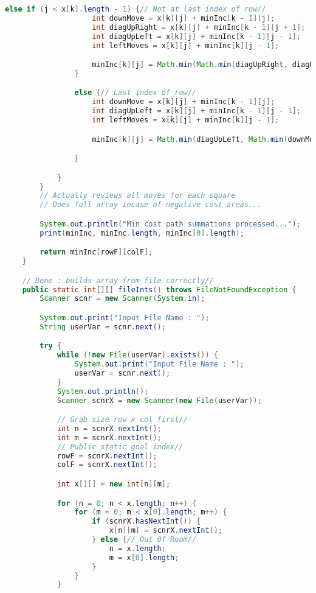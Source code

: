 \documentclass[11pt]{article}
\begin{document}
\begin{enumerate}
\begin{lstlisting}[language=Java]
                else if (j < x[k].length - 1) {// Not at last index of row//
                    int downMove = x[k][j] + minInc[k - 1][j];
                    int diagUpRight = x[k][j] + minInc[k - 1][j + 1];
                    int diagUpLeft = x[k][j] + minInc[k - 1][j - 1];
                    int leftMoves = x[k][j] + minInc[k][j - 1];

                    minInc[k][j] = Math.min(Math.min(diagUpRight, diagUpLeft), Math.min(downMove, leftMoves));
                }

                else {// Last index of row//
                    int downMove = x[k][j] + minInc[k - 1][j];
                    int diagUpLeft = x[k][j] + minInc[k - 1][j - 1];
                    int leftMoves = x[k][j] + minInc[k][j - 1];

                    minInc[k][j] = Math.min(diagUpLeft, Math.min(downMove, leftMoves));

                }

            }
        }
        // Actually reviews all moves for each square
        // Does full array incase of negative cost areas...

        System.out.println("Min cost path summations processed...");
        print(minInc, minInc.length, minInc[0].length);

        return minInc[rowF][colF];
    }

    // Done : builds array from file correctly//
    public static int[][] fileInts() throws FileNotFoundException {
        Scanner scnr = new Scanner(System.in);

        System.out.print("Input File Name : ");
        String userVar = scnr.next();

        try {
            while (!new File(userVar).exists()) {
                System.out.print("Input File Name : ");
                userVar = scnr.next();
            }
            System.out.println();
            Scanner scnrX = new Scanner(new File(userVar));

            // Grab size row x col first//
            int n = scnrX.nextInt();
            int m = scnrX.nextInt();
            // Public static goal index//
            rowF = scnrX.nextInt();
            colF = scnrX.nextInt();

            int x[][] = new int[n][m];

            for (n = 0; n < x.length; n++) {
                for (m = 0; m < x[0].length; m++) {
                    if (scnrX.hasNextInt()) {
                        x[n][m] = scnrX.nextInt();
                    } else {// Out Of Room//
                        n = x.length;
                        m = x[0].length;
                    }
                }
            }


\end{lstlisting}
\end{enumerate}
\end{document}

